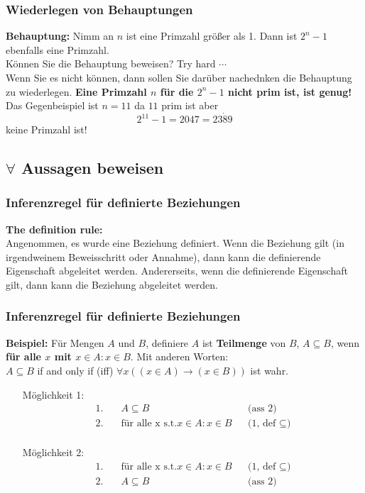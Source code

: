 \subsubsection*{Wiederlegen von Behauptungen} 
\textbf{Behauptung: } Nimm an $n$ ist eine Primzahl größer als 1. Dann ist $2^n - 1$ ebenfalls eine Primzahl. \\Können Sie die Behauptung beweisen? Try hard $\cdots$\\ Wenn Sie es nicht können, dann sollen Sie darüber nachednken die Behauptung zu wiederlegen. \textbf{Eine Primzahl $n$ für die $2^n - 1$ nicht prim ist, ist genug!}\\ Das Gegenbeispiel ist $n = 11$ da $11$ prim ist aber \[2^11 - 1 = 2047 = 23 \dot 89\] keine Primzahl ist!

\subsection{$\forall$ Aussagen beweisen}
\subsubsection*{Inferenzregel für definierte Beziehungen}
\textbf{The definition rule: }\\ Angenommen, es wurde eine Beziehung definiert. Wenn die Beziehung gilt (in irgendweinem Beweisschritt oder Annahme), dann kann die definierende Eigenschaft abgeleitet werden. Andererseits, wenn die definierende Eigenschaft gilt, dann kann die Beziehung abgeleitet werden.

\subsubsection*{Inferenzregel für definierte Beziehungen}
\textbf{Beispiel: } Für Mengen $A$ und $B$, definiere $A$ ist \textbf{Teilmenge} von $B$, $A \subseteq B$, wenn \textbf{für alle $x$ mit $x \in A : x \in B$}. Mit anderen Worten: \\ $A \subseteq B$ if and only if (iff) $\forall x ((x \in A) \rightarrow (x \in B))$ ist wahr.
\begin{itemize}
    \item [Möglichkeit 1:]
        \begin{align*}
            1. &\quad A \subseteq B                   && \text{(ass 2)} \\
            2. &\quad \text{für alle x s.t.} x \in A : x \in B                      && \text{(1, def $\subseteq$)} \\
        \end{align*}
    \item [Möglichkeit 2:]
        \begin{align*}
            1. &\quad \text{für alle x s.t.} x \in A : x \in B                      && \text{(1, def $\subseteq$)} \\
            2. &\quad A \subseteq B                   && \text{(ass 2)} \\
        \end{align*}
\end{itemize}